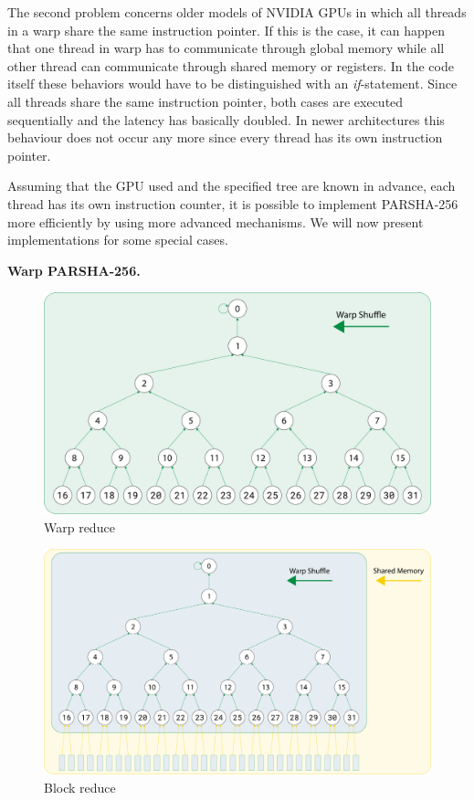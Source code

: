 \documentclass[letterpaper]{article}
\newcommand{\mypar}[1]{{\bf #1.}}
\begin{document}
The second problem concerns older models of NVIDIA GPUs in which all threads in a warp share the same instruction pointer. If this is the case, it can happen that one thread in warp has to communicate through global memory while all other thread can communicate through shared memory or registers.
In the code itself these behaviors would have to be distinguished with an \emph{if}-statement. Since all threads share the same instruction pointer, both cases are executed sequentially and the latency has basically doubled. In newer architectures this behaviour does not occur any more since every thread has its own instruction pointer.

Assuming that the GPU used and the specified tree are known in advance, each thread has its own instruction counter, it is possible to implement PARSHA-256 more efficiently by using more advanced mechanisms. We will now present implementations for some special cases.

\mypar{Warp PARSHA-256}\\

\begin{figure}\centering
\includegraphics[scale=0.15]{warp.pdf}
  \caption{Warp reduce}
\end{figure}


\begin{figure}\centering
\includegraphics[scale=0.125]{block.pdf}
  \caption{Block reduce}
\end{figure}
\end{document}
